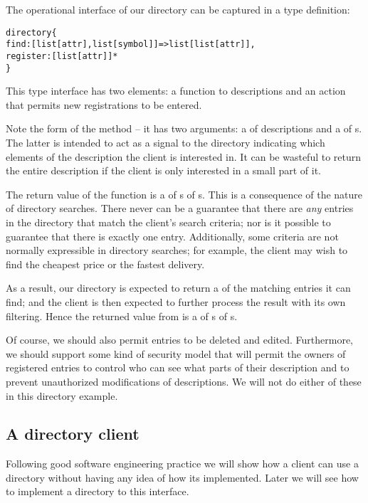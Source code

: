 The operational interface of our directory can be captured in a type definition:
\begin{alltt}
directory \typearrow{} \{
  find:[list[attr],list[symbol]]=>list[list[attr]],
  register:[list[attr]]*
\}
\end{alltt}
This type interface has two elements: a function to  descriptions and an action  that permits new registrations to be entered.

Note the form of the  method -- it has two arguments: a  of  descriptions and a  of s. The latter is intended to act as a signal to the directory indicating which elements of the description the client is interested in. It can be wasteful to return the entire description if the client is only interested in a small part of it.

The return value of the  function is a  of s of s. This is a consequence of the nature of directory searches. There never can be a guarantee that there are \emph{any} entries in the directory that match the client's search criteria; nor is it possible to guarantee that there is exactly one entry. Additionally, some criteria are not normally expressible in directory searches; for example, the client may wish to find the cheapest price or the fastest delivery. 

As a result, our directory is expected to return a  of the matching entries it can find; and the client is then expected to further process the result with its own filtering. Hence the returned value from  is a  of s of s.

\begin{aside}
Of course, we should also permit entries to be deleted and edited. Furthermore, we should support some kind of security model that will permit the owners of registered entries to control who can see what parts of their description and to prevent unauthorized modifications of descriptions.  We will not do either of these in this directory example.
\end{aside}

\subsection{A directory client}
\label{directory:client}
Following good software engineering practice we will show how a client can use a directory without having any idea of how its implemented. Later we will see how to implement a directory to this interface.

